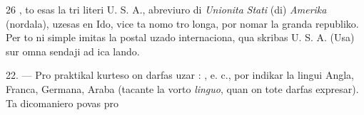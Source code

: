 \begin{VUpage}[30]{26}
, to esas la tri literi U. S. A., abreviuro di \textit{Unionita}\nl
\textit{Stati} (di) \textit{Amerika} (nordala), uzesas en Ido, vice ta nomo\nl
tro longa, por nomar la granda republiko. Per to ni simple\nl
imitas la postal uzado internaciona, qua skribas U. S. A.\nl
(Usa) sur omna sendaji ad ica lando.

\VUblanc{4.67pt}%
22. --- Pro praktikal kurteso on darfas uzar : \nl
{}, e. c., por indikar la lingui\nl
Angla, Franca, Germana, Araba (tacante la vorto \textit{linguo},\nl
quan on tote darfas expresar). Ta dicomaniero povas pro
\parplein
\end{VUpage}

